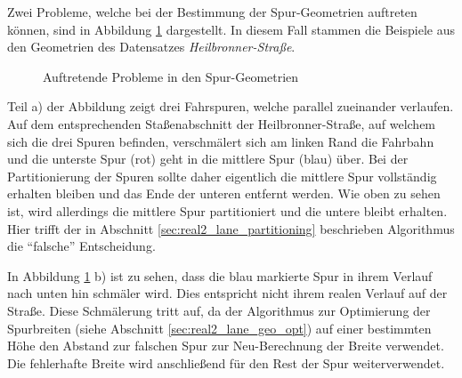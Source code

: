 Zwei Probleme, welche bei der Bestimmung der Spur-Geometrien auftreten können, sind in Abbildung
\ref{fig:results_defekts_laneGeos} dargestellt. In diesem Fall stammen die Beispiele aus den Geometrien
des Datensatzes \textit{Heilbronner-Straße}.

\begin{figure}[H]
    \centering
    \qquad \qquad
    \caption{Auftretende Probleme in den Spur-Geometrien}
    \label{fig:results_defekts_laneGeos}
\end{figure}

Teil a) der Abbildung zeigt drei Fahrspuren, welche parallel zueinander verlaufen.
Auf dem entsprechenden Staßenabschnitt der Heilbronner-Straße, auf welchem sich die drei Spuren befinden,
verschmälert sich am linken Rand die Fahrbahn und die unterste Spur (rot) geht in die mittlere Spur (blau) über.
Bei der Partitionierung der Spuren sollte daher eigentlich die mittlere Spur vollständig erhalten bleiben
und das Ende der unteren entfernt werden. Wie oben zu sehen ist, wird allerdings die mittlere Spur partitioniert
und die untere bleibt erhalten. Hier trifft der in Abschnitt \ref{sec:real2_lane_partitioning} beschrieben
Algorithmus die ``falsche'' Entscheidung.

In Abbildung \ref{fig:results_defekts_laneGeos} b) ist zu sehen, dass die blau markierte Spur
in ihrem Verlauf nach unten hin schmäler wird. Dies entspricht nicht ihrem realen Verlauf auf der Straße.
Diese Schmälerung tritt auf, da der Algorithmus zur Optimierung der Spurbreiten (siehe Abschnitt \ref{sec:real2_lane_geo_opt})
auf einer bestimmten Höhe den Abstand zur falschen Spur zur Neu-Berechnung der Breite verwendet.
Die fehlerhafte Breite wird anschließend für den Rest der Spur weiterverwendet.

